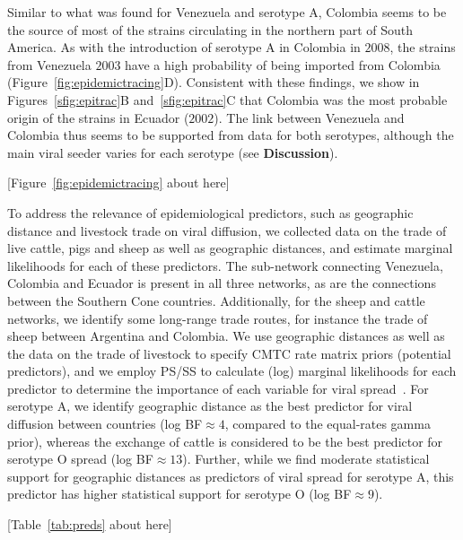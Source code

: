 \documentclass[10pt]{article}
\begin{document}
Similar to what was found for Venezuela and serotype A, Colombia seems to be the source of most of the strains circulating in the northern part of South America.
As with the introduction of serotype A in Colombia in $2008$, the strains from Venezuela $2003$ have a high probability of being imported from Colombia (Figure~\ref{fig:epidemictracing}D).
Consistent with these findings, we show in Figures~\ref{sfig:epitrac}B and~\ref{sfig:epitrac}C that Colombia was the most probable origin of the strains in Ecuador ($2002$).
The link between Venezuela and Colombia thus seems to be supported from data for both serotypes, although the main viral seeder varies for each serotype (see \textbf{Discussion}).

\begin{center}
 [Figure~\ref{fig:epidemictracing} about here]
\end{center}

To address the relevance of epidemiological predictors, such as geographic distance and livestock trade on viral diffusion, we collected data on the trade of live cattle, pigs and sheep  as well as geographic distances, and estimate marginal likelihoods for each of these predictors.
The sub-network connecting Venezuela, Colombia and Ecuador is present in all three networks, as are the connections between the Southern Cone countries.
Additionally, for the sheep and cattle networks, we identify some long-range trade routes, for instance the trade of sheep between Argentina and Colombia.
We use geographic distances as well as the data on the trade of livestock to specify CMTC rate matrix priors (potential predictors), and we employ PS/SS to calculate (log) marginal likelihoods for each predictor to determine the importance of each variable for viral spread~\cite{Carvalho2013, Nelson2011}.
For serotype A, we identify geographic distance as the best predictor for viral diffusion between countries (log BF$\approx 4$, compared to the equal-rates gamma prior), whereas the exchange of cattle is considered to be the best predictor for serotype O spread (log BF$\approx 13$). 
Further, while we find moderate statistical support for geographic distances as predictors of viral spread for serotype A, this predictor has higher statistical support for serotype O (log BF$\approx 9$).

\begin{center}
 [Table~\ref{tab:preds} about here]
\end{center}
\end{document}
